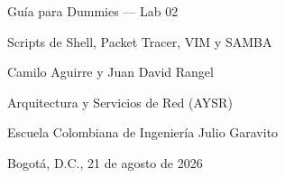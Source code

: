 \documentclass[11pt,a4paper]{report}
\begin{document}
\sloppy

\begin{titlepage}
  \centering
  \vspace*{1cm}

  {\large Guía para Dummies --- Lab 02 \par}
  {\large Scripts de Shell, Packet Tracer, VIM y SAMBA \par}
  \vspace{1.5cm}

  {\large Camilo Aguirre y Juan David Rangel \par}
  \vspace{0.8cm}

  {\large Arquitectura y Servicios de Red (AYSR) \par}
  {\large Escuela Colombiana de Ingeniería Julio Garavito \par}
  \vspace{1cm}

  {\large Bogotá, D.C., 21 de agosto de 2026 \par}

  \vfill
\end{titlepage}

\tableofcontents
\newpage



\end{document}
